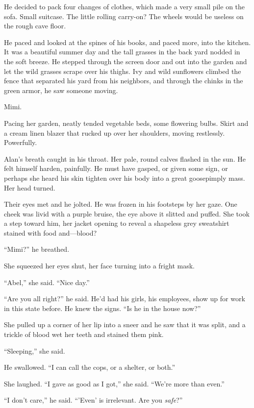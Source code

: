 He decided to pack four changes of clothes, which made a very small
pile on the sofa.  Small suitcase.  The little rolling carry-on?  The
wheels would be useless on the rough cave floor.

He paced and looked at the spines of his books, and paced more, into
the kitchen.  It was a beautiful summer day and the tall grasses in
the back yard nodded in the soft breeze.  He stepped through the
screen door and out into the garden and let the wild grasses scrape
over his thighs.  Ivy and wild sunflowers climbed the fence that
separated his yard from his neighbors, and through the chinks in the
green armor, he saw someone moving.

Mimi.

Pacing her garden, neatly tended vegetable beds, some flowering bulbs. 
Skirt and a cream linen blazer that rucked up over her shoulders,
moving restlessly.  Powerfully.

Alan's breath caught in his throat.  Her pale, round calves flashed in
the sun.  He felt himself harden, painfully.  He must have gasped, or
given some sign, or perhaps she heard his skin tighten over his body
into a great goosepimply mass.  Her head turned.

Their eyes met and he jolted.  He was frozen in his footsteps by her
gaze.  One cheek was livid with a purple bruise, the eye above it
slitted and puffed.  She took a step toward him, her jacket opening to
reveal a shapeless grey sweatshirt stained with food and---blood?

``Mimi?'' he breathed.

She squeezed her eyes shut, her face turning into a fright mask.

``Abel,'' she said.  ``Nice day.''

``Are you all right?'' he said.  He'd had his girls, his employees,
show up for work in this state before.  He knew the signs.  ``Is he in
the house now?''

She pulled up a corner of her lip into a sneer and he saw that it was
split, and a trickle of blood wet her teeth and stained them pink.

``Sleeping,'' she said.

He swallowed.  ``I can call the cops, or a shelter, or both.''

She laughed.  ``I gave as good as I got,'' she said.  ``We're more
than even.''

``I don't care,'' he said.  ``'Even' is irrelevant.  Are you
\textit{safe}?''

